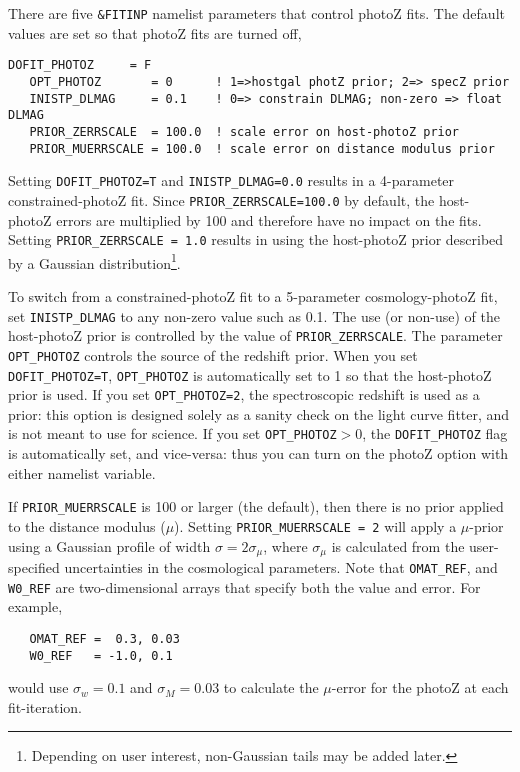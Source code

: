 \documentclass[12pt]{article}
\begin{document}
There are five {\tt \&FITINP} namelist parameters that
control photoZ fits. The default values are set so
that photoZ fits are turned off,
%
\begin{Verbatim}[frame=single]
   DOFIT_PHOTOZ     = F
   OPT_PHOTOZ       = 0      ! 1=>hostgal photZ prior; 2=> specZ prior
   INISTP_DLMAG     = 0.1    ! 0=> constrain DLMAG; non-zero => float DLMAG
   PRIOR_ZERRSCALE  = 100.0  ! scale error on host-photoZ prior
   PRIOR_MUERRSCALE = 100.0  ! scale error on distance modulus prior
\end{Verbatim}
%
Setting {\tt DOFIT\_PHOTOZ=T} and {\tt INISTP\_DLMAG=0.0}
results in a 4-parameter constrained-photoZ fit.
Since {\tt PRIOR\_ZERRSCALE=100.0} by default, the host-photoZ
errors are multiplied by 100 and therefore have no impact on the fits.
Setting {\tt PRIOR\_ZERRSCALE = 1.0} results in using the 
host-photoZ prior described by a Gaussian 
distribution\footnote{Depending on user interest, 
non-Gaussian tails may be added later.}.


To switch from a constrained-photoZ fit to a 5-parameter
cosmology-photoZ fit, set {\tt INISTP\_DLMAG} to any
non-zero value such as 0.1. The use (or non-use) of the
host-photoZ prior is controlled by the value of 
{\tt PRIOR\_ZERRSCALE}.
The parameter {\tt OPT\_PHOTOZ} controls the source of
the redshift prior. 
When you set {\tt DOFIT\_PHOTOZ=T}, 
{\tt OPT\_PHOTOZ} is automatically set to 1 so that the
host-photoZ prior is used.  
If you set {\tt OPT\_PHOTOZ=2}, the spectroscopic redshift
is used as a prior: this option is designed solely as a
sanity check on the light curve fitter, and is not meant
to use for science.
If you set {\tt OPT\_PHOTOZ$>0$}, the {\tt DOFIT\_PHOTOZ} flag is
automatically set, and vice-versa: thus you can turn on the
photoZ option with either namelist variable.

If {\tt PRIOR\_MUERRSCALE} is 100 or larger (the default),
then there is no prior applied to the distance modulus ($\mu$).
Setting {\tt PRIOR\_MUERRSCALE = 2} will apply a $\mu$-prior
using a Gaussian profile of width $\sigma = 2\sigma_{\mu}$,
where $\sigma_{\mu}$ is calculated from the user-specified
uncertainties in the cosmological parameters.
Note that {\tt OMAT\_REF}, and {\tt W0\_REF} are two-dimensional
arrays that specify both the value and error. 
For example,
\begin{verbatim}
   OMAT_REF =  0.3, 0.03  
   W0_REF   = -1.0, 0.1
\end{verbatim}
% 
would use $\sigma_w=0.1$ and $\sigma_M=0.03$ to calculate
the $\mu$-error for the photoZ at each fit-iteration.
\end{document}
